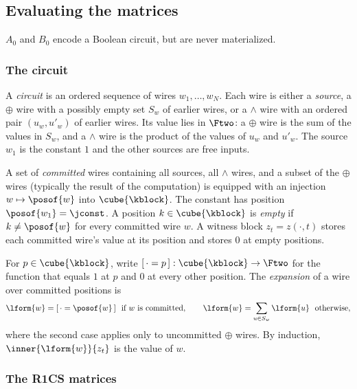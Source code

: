 \subsection{Evaluating the matrices}\label{flock:matrices}

$A_0$ and $B_0$ encode a Boolean circuit, but are never materialized.

\subsubsection{The circuit}\label{flock:circuit}

\begin{definition}[Circuit]\label{def:circuit}
A \emph{circuit} is an ordered sequence of wires $w_1,\ldots,w_N$. Each wire is either a \emph{source}, a $\oplus$ wire with a possibly empty set $S_w$ of earlier wires, or a $\wedge$ wire with an ordered pair $(u_w,u'_w)$ of earlier wires. Its value lies in $\Ftwo$: a $\oplus$ wire is the sum of the values in $S_w$, and a $\wedge$ wire is the product of the values of $u_w$ and $u'_w$. The source $w_1$ is the constant $1$ and the other sources are free inputs.

A set of \emph{committed} wires containing all sources, all $\wedge$ wires, and a subset of the $\oplus$ wires (typically the result of the computation) is equipped with an injection $w\mapsto\posof{w}$ into $\cube{\kblock}$. The constant has position $\posof{w_1}=\jconst$. A position $k\in\cube{\kblock}$ is \emph{empty} if $k\neq\posof{w}$ for every committed wire $w$. A witness block $z_t=z(\cdot,t)$ stores each committed wire's value at its position and stores $0$ at empty positions.
\end{definition}

For $p\in\cube{\kblock}$, write $[\,\cdot=p\,]:\cube{\kblock}\to\Ftwo$ for the function that equals $1$ at $p$ and $0$ at every other position. The \emph{expansion} of a wire over committed positions is
\begin{equation}\label{flock:eq:expand}
\lform{w}=[\,\cdot=\posof{w}\,]\ \text{ if $w$ is committed},\qquad \lform{w}=\sum_{u\in S_w}\lform{u}\ \text{ otherwise},
\end{equation}
where the second case applies only to uncommitted $\oplus$ wires. By induction, $\inner{\lform{w}}{z_t}$ is the value of $w$.

\subsubsection{The R1CS matrices}\label{flock:rows}

